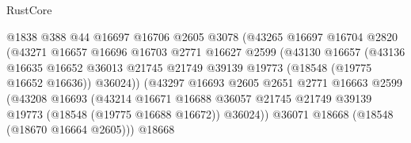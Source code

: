\begin{lexlean}{RustCore}
\begin{coremodule}
                                    @1838
                                    @388
                                    @44
                                    @16697
                                    @16706
                                    @2605
                                    @3078
                                    (@43265
                                      @16697
                                      @16704
                                      @2820
                                      (@43271
                                        @16657
                                        @16696
                                        @16703
                                        @2771
                                        @16627
                                        @2599
                                        (@43130
                                          @16657
                                          (@43136
                                            @16635
                                            @16652
                                            @36013
                                            @21745
                                            @21749
                                            @39139
                                            @19773
                                            (@18548 (@19775 @16652 @16636))
                                            @36024))
                                        (@43297
                                          @16693
                                          @2605
                                          @2651
                                          @2771
                                          @16663
                                          @2599
                                          (@43208
                                            @16693
                                            (@43214
                                              @16671
                                              @16688
                                              @36057
                                              @21745
                                              @21749
                                              @39139
                                              @19773
                                              (@18548 (@19775 @16688 @16672))
                                              @36024))
                                          @36071
                                          @18668
                                          (@18548 (@18670 @16664 @2605)))
                                        @18668

\end{coremodule}
\end{lexlean}
